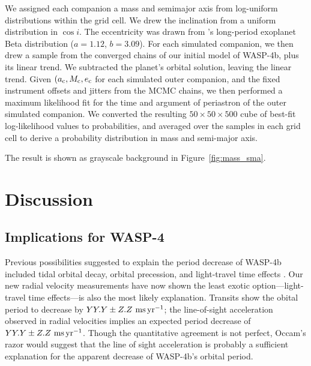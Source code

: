 \documentclass[12pt,twocolumn,tighten]{aastex62}
\begin{document}
We assigned each companion a mass and semimajor axis from log-uniform
distributions within the grid cell. We drew the inclination from a
uniform distribution in $\cos i$.  The eccentricity was drawn from
\citet{kipping_beta_2013}'s long-period exoplanet Beta distribution
($a=1.12$, $b=3.09$).  For each simulated companion, we then drew a
sample from the converged chains of our initial model of WASP-4b, plus
its linear trend. We subtracted the planet's orbital solution, leaving
the linear trend.  Given $(a_{\rm c}, M_{\rm c}, e_{\rm c}$ for each
simulated outer companion, and the fixed instrument offsets and
jitters from the MCMC chains, we then performed a maximum likelihood
fit for the time and argument of periastron of the outer simulated
companion.  We converted the resulting $50\times50\times500$ cube of
best-fit log-likelihood values to probabilities, and averaged over the
samples in each grid cell to derive a probability distribution in mass
and semi-major axis.

The result is shown as grayscale background in
Figure~\ref{fig:mass_sma}.



\section{Discussion}
\label{sec:discussion}

\subsection{Implications for WASP-4}
Previous possibilities suggested to explain the period decrease of
WASP-4b included tidal orbital decay, orbital precession, and
light-travel time effects \citep{bouma_wasp4b_2019}.  Our new radial
velocity measurements have now shown the least exotic
option---light-travel time effects---is also the most likely
explanation.  Transits show the obital period to decrease by $YY.Y \pm
Z.Z~{\rm ms}\,{\rm yr}^{-1}$; the line-of-sight acceleration observed
in radial velocities implies an expected period decrease of $YY.Y \pm
Z.Z~{\rm ms}\,{\rm yr}^{-1}$.  
Though the quantitative agreement is not perfect, Occam's razor would
suggest that the line of sight acceleration is probably a sufficient
explanation for the apparent decrease of WASP-4b's orbital period.
\end{document}
